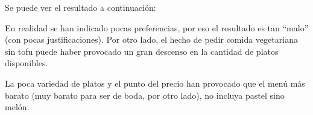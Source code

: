 Se puede ver el resultado a continuación:


En realidad se han indicado pocas preferencias, por eso el resultado es tan
``malo'' (con pocas justificaciones). Por otro lado, el hecho de pedir comida
vegetariana sin tofu puede haber provocado un gran descenso en la cantidad de
platos disponibles.

La poca variedad de platos y el punto del precio han provocado que el menú más
barato (muy barato para ser de boda, por otro lado), no incluya pastel sino
melón.
